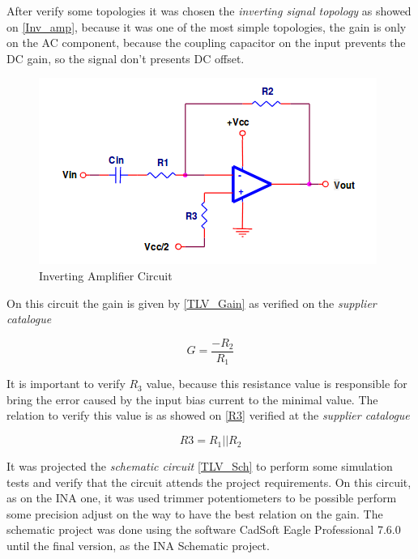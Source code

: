 After verify some topologies it was chosen the \textit{inverting signal topology} \cite{OpAmps} as showed on \autoref{Inv_amp}, because it was one of the most simple topologies, the
gain is only on the AC component, because the coupling capacitor on the input prevents the DC gain, so the signal don't presents
DC offset.

\begin{figure}[!htpb]
\centering
\caption{Inverting Amplifier Circuit}
\label{Inv_amp}
\includegraphics[scale=1]{images/TLV_Gain}
\end{figure}

On this circuit the gain is given by \autoref{TLV_Gain} as verified on the \textit{supplier catalogue} \cite{OpAmps}

\begin{equation}
\label{TLV_Gain}
G=\frac{-R_2}{R_1}
\end{equation}

It is important to verify $R_3$ value, because this resistance value is responsible for bring the error caused by the
input bias current to the minimal value. The relation to verify this value is as showed on \autoref{R3} verified at
the \textit{supplier catalogue} \cite{OpAmps}

\begin{equation}
\label{R3}
R3=R_1||R_2
\end{equation}

It was projected the \textit{schematic circuit} \autoref{TLV_Sch} to perform some simulation tests and verify that the circuit attends the project
requirements. On this circuit, as on the INA one, it was used trimmer potentiometers to be possible perform some precision adjust on the way to have
the best relation on the gain. The schematic project was done using the software CadSoft Eagle Professional 7.6.0 until the final version, as the INA
Schematic project.

